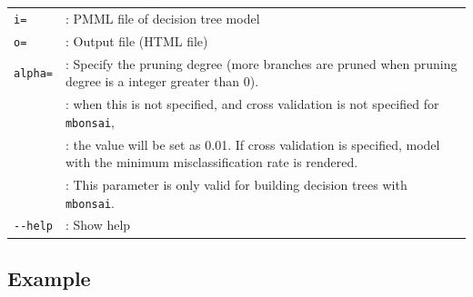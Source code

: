 \begin{table}[htbp]
{\small
\begin{tabular}{ll}
\verb|i=| & : PMML file of decision tree model \\
\verb|o=| & : Output file (HTML file) \\
\verb|alpha=| & : Specify the pruning degree (more branches are pruned when pruning degree is a integer greater than 0).  \\
              & : when this is not specified,  and cross validation is not specified for \verb|mbonsai|, \\
              & : the value will be set as 0.01. If cross validation is specified, model with the minimum misclassification rate is rendered. \\
              & : This parameter is only valid for building decision trees with \verb|mbonsai|.\\
\verb|--help| & : Show help  \\
\end{tabular} 
}
\end{table} 

\subsection{Example}


%

